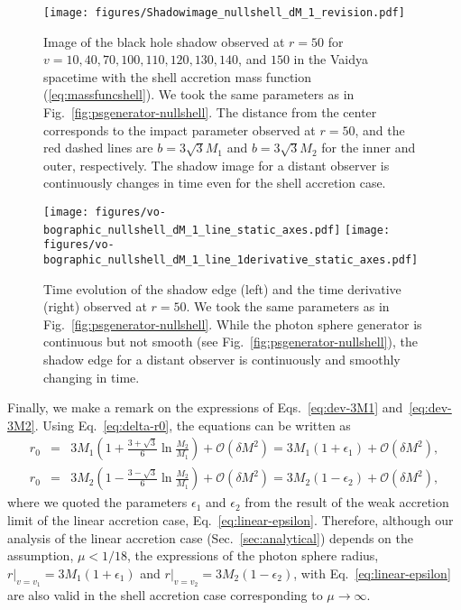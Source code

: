 \documentclass[prd,showpacs,preprintnumbers,groupedaddress,superscriptaddress,nofootinbib,11pt]{revtex4-1} %
\theoremstyle{newplain}
\begin{document}
\begin{figure}[t]
\texttt{[image: figures/Shadowimage\_nullshell\_dM\_1\_revision.pdf]}
\caption{\label{fig:Shadowimage-nullshell} 
Image of the black hole shadow observed at $r=50$ for $v=10, 40,70, 100, 110, 120, 130, 140$, and $150$ in the Vaidya spacetime with the shell accretion mass function (\ref{eq:massfuncshell}). We took the same parameters as in Fig.~\ref{fig:psgenerator-nullshell}. The distance from the center corresponds to the impact parameter observed at $r=50$, and the red dashed lines are $b=3 \sqrt{3} M_1$ and $b=3 \sqrt{3}M_2$ for the inner and outer, respectively.
The shadow image for a distant observer is
continuously changes in time even for the shell accretion case.
}
\end{figure}

\begin{figure}[h]
\texttt{[image: figures/vo-bographic\_nullshell\_dM\_1\_line\_static\_axes.pdf]}
\texttt{[image: figures/vo-bographic\_nullshell\_dM\_1\_line\_1derivative\_static\_axes.pdf]}
\caption{\label{fig:vo-bo_graph-shell} 
Time evolution of the shadow edge (left) and the time derivative (right) observed at $r=50$. 
We took the same parameters as in Fig.~\ref{fig:psgenerator-nullshell}.
While the photon sphere generator is continuous but not smooth (see Fig.~\ref{fig:psgenerator-nullshell}),
the shadow edge for a distant observer is continuously and smoothly changing in time.
}
\end{figure}

Finally, we make a remark on the expressions of Eqs.~\eqref{eq:dev-3M1} and~\eqref{eq:dev-3M2}.
Using Eq.~\eqref{eq:delta-r0}, the equations can be written as
\begin{eqnarray}
r_0&=&3M_1(1+\frac{3+\sqrt{3}}{6}\ln\frac{M_2}{M_1})+\mathcal{O}(\delta M^2)=3M_1(1+\epsilon_1)+\mathcal{O}(\delta M^2),\nonumber\\
r_0&=&3M_2(1-\frac{3-\sqrt{3}}{6}\ln\frac{M_2}{M_1})+\mathcal{O}(\delta M^2)=3M_2(1-\epsilon_2)+\mathcal{O}(\delta M^2),
\end{eqnarray}
where we quoted the parameters $\epsilon_1$ and $\epsilon_2$ from the result of the weak accretion limit of the linear accretion case, Eq.~\eqref{eq:linear-epsilon}.
Therefore, although our analysis of the linear accretion case (Sec.~\ref{sec:analytical}) depends on the assumption, $\mu<1/18$, the expressions of the photon sphere radius, $r|_{v=v_1}=3M_1(1+\epsilon_1)$ and $r|_{v=v_2}=3M_2(1-\epsilon_2)$, with Eq.~\eqref{eq:linear-epsilon} are also valid in the shell accretion case corresponding to $\mu\to\infty$.
\end{document}
